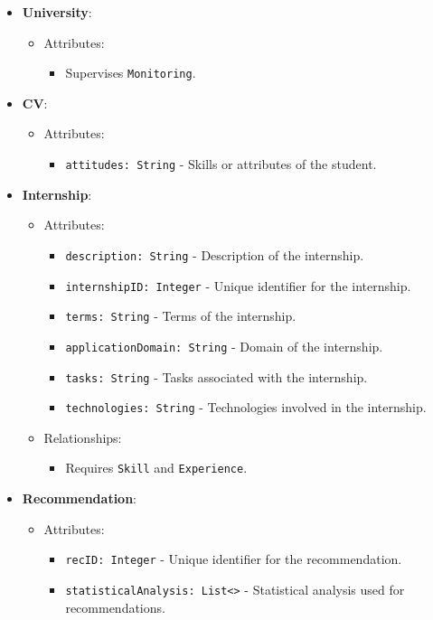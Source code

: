 \begin{itemize}
    \item \textbf{University}:
    \begin{itemize}
        \item Attributes:
        \begin{itemize}
            \item Supervises \texttt{Monitoring}.
        \end{itemize}
    \end{itemize}

    \item \textbf{CV}:
    \begin{itemize}
        \item Attributes:
        \begin{itemize}
            \item \texttt{attitudes: String} - Skills or attributes of the student.
        \end{itemize}
    \end{itemize}

    \item \textbf{Internship}:
    \begin{itemize}
        \item Attributes:
        \begin{itemize}
            \item \texttt{description: String} - Description of the internship.
            \item \texttt{internshipID: Integer} - Unique identifier for the internship.
            \item \texttt{terms: String} - Terms of the internship.
            \item \texttt{applicationDomain: String} - Domain of the internship.
            \item \texttt{tasks: String} - Tasks associated with the internship.
            \item \texttt{technologies: String} - Technologies involved in the internship.
        \end{itemize}
        \item Relationships:
        \begin{itemize}
            \item Requires \texttt{Skill} and \texttt{Experience}.
        \end{itemize}
    \end{itemize}

    \item \textbf{Recommendation}:
    \begin{itemize}
        \item Attributes:
        \begin{itemize}
            \item \texttt{recID: Integer} - Unique identifier for the recommendation.
            \item \texttt{statisticalAnalysis: List<>} - Statistical analysis used for recommendations.
        \end{itemize}
    \end{itemize}


\end{itemize}
